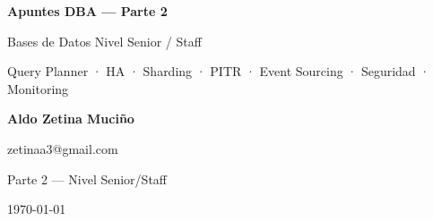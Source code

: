 \documentclass[12pt, a4paper, openany]{book}
\begin{document}
\begin{titlepage}
  \centering
  \vspace*{3cm}
  {\Huge\bfseries Apuntes DBA — Parte 2\par}
  \vspace{1em}
  {\Large Bases de Datos Nivel Senior / Staff\par}
  \vspace{0.5em}
  {\large\color{n-cyan} Query Planner · HA · Sharding · PITR · Event Sourcing · Seguridad · Monitoring\par}
  \vspace{3cm}
  {\large\bfseries Aldo Zetina Muci\~no\par}
  \vspace{0.5em}
  {\normalsize zetinaa3@gmail.com\par}
  \vfill
  {\normalsize Parte 2 — Nivel Senior/Staff\par}
  {\normalsize \today\par}
\end{titlepage}

\tableofcontents
\newpage











\end{document}

